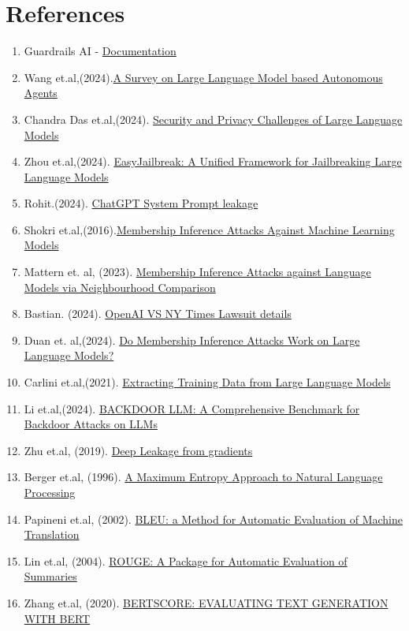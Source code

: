 \documentclass[12pt]{article}
\begin{document}
    \section*{References}
    \begin{enumerate}
        \item Guardrails AI - \href{https://www.guardrailsai.com/docs}{Documentation}
        \item Wang et.al,(2024).\href{https://arxiv.org/pdf/2308.11432}{A Survey on Large Language Model based Autonomous Agents}
        \item Chandra Das et.al,(2024). \href{https://arxiv.org/pdf/2402.00888}{Security and Privacy Challenges of Large Language Models}
        \item Zhou et.al,(2024). \href{https://arxiv.org/pdf/2403.12171}{EasyJailbreak: A Unified Framework for Jailbreaking Large Language
        Models}
        \item Rohit.(2024). \href{https://x.com/krishnanrohit/status/1755122786014724125}{ChatGPT System Prompt leakage}
        \item Shokri et.al,(2016).\href{https://arxiv.org/pdf/1610.05820}{Membership Inference Attacks Against Machine Learning Models}
        \item Mattern et. al, (2023). \href{https://arxiv.org/pdf/2305.18462}{Membership Inference Attacks against Language Models via Neighbourhood Comparison}
        \item Bastian. (2024). \href{https://the-decoder.com/openai-claims-new-york-times-prompting-strategy-violates-its-terms-of-service/}{OpenAI VS NY Times Lawsuit details}
        \item Duan et. al,(2024). \href{https://arxiv.org/pdf/2402.07841}{Do Membership Inference Attacks Work on Large Language Models?}
        \item Carlini et.al,(2021). \href{https://arxiv.org/pdf/2012.07805}{Extracting Training Data from Large Language Models}
        \item Li et.al,(2024). \href{https://arxiv.org/pdf/2408.12798}{BACKDOOR LLM: A Comprehensive Benchmark for Backdoor Attacks on LLMs}
        \item Zhu et.al, (2019). \href{https://arxiv.org/pdf/1906.08935}{Deep Leakage from gradients}
        \item Berger et.al, (1996). \href{https://aclanthology.org/J96-1002.pdf}{A Maximum Entropy Approach to Natural Language Processing}
        \item Papineni et.al, (2002). \href{https://aclanthology.org/P02-1040.pdf}{BLEU: a Method for Automatic Evaluation of Machine Translation}
        \item Lin et.al, (2004). \href{https://aclanthology.org/W04-1013.pdf}{ROUGE: A Package for Automatic Evaluation of Summaries}
        \item Zhang et.al, (2020). \href{https://arxiv.org/pdf/1904.09675}{BERTSCORE: EVALUATING TEXT GENERATION WITH BERT}
    \end{enumerate}
\end{document}
